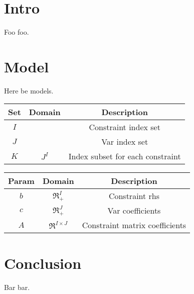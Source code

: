 \documentclass{article}
\begin{document}
\section{Intro}
Foo foo.

\section{Model}
Here be models.

\begin{tabular}{c|c|c} \label{tab:set}
    Set & Domain & Description \\
    \hline
    $I$ & & Constraint index set \\
    $J$ & & Var index set \\
    $K$ & $J^I$ & Index subset for each constraint \\
\end{tabular}
    
\begin{tabular}{c|c|c} \label{tab:param}
    Param & Domain & Description \\
    \hline
    $b$ & $\Re^I_+$ & Constraint rhs \\
    $c$ & $\Re^J_+$ & Var coefficients \\
    $A$ & $\Re^{I \times J}$ & Constraint matrix coefficients \\
\end{tabular}
        
\section{Conclusion}
Bar bar.
\end{document}
